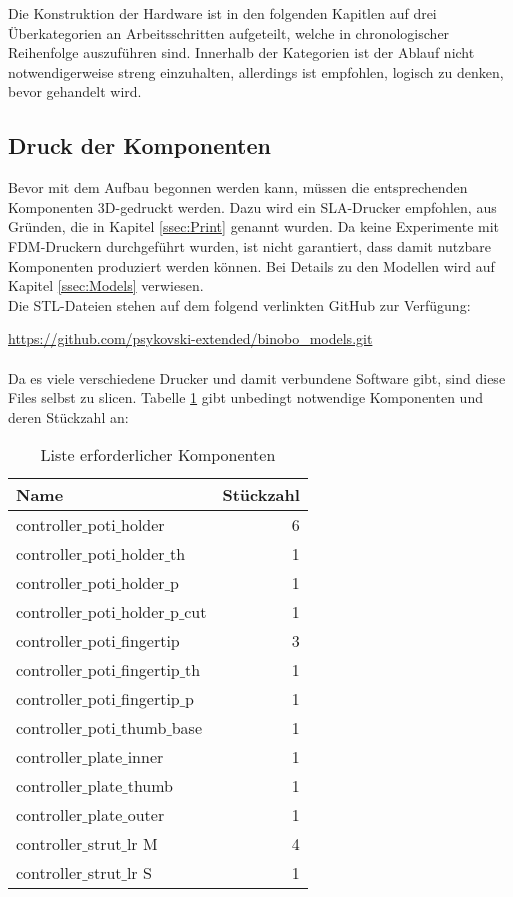 Die Konstruktion der Hardware ist in den folgenden Kapitlen auf drei Überkategorien 
an Arbeitsschritten aufgeteilt, welche in chronologischer Reihenfolge auszuführen sind. 
Innerhalb der Kategorien ist der Ablauf nicht notwendigerweise streng einzuhalten, 
allerdings ist empfohlen, logisch zu denken, bevor gehandelt wird.

\subsection{Druck der Komponenten}
\label{ssec:print}
Bevor mit dem Aufbau begonnen werden kann, müssen die entsprechenden Komponenten 3D-gedruckt 
werden. Dazu wird ein SLA-Drucker empfohlen, aus Gründen, die in Kapitel \ref{ssec:Print} genannt wurden. 
Da keine Experimente mit FDM-Druckern durchgeführt wurden, ist nicht garantiert, dass damit nutzbare 
Komponenten produziert werden können.
Bei Details zu den Modellen wird auf Kapitel \ref{ssec:Models} verwiesen.
\\
Die STL-Dateien stehen auf dem folgend verlinkten GitHub zur Verfügung:

\url{https://github.com/psykovski-extended/binobo_models.git}
\\\\
Da es viele verschiedene Drucker und damit verbundene Software gibt, sind diese Files selbst zu 
slicen. Tabelle \ref{tab:comp} gibt unbedingt notwendige Komponenten und deren Stückzahl an:

\begin{table}[H]
    \centering
    \begin{tabular}{|l|r|}
        \hline
        Name&Stückzahl\\
        \hline
        \hline
        controller$\_$poti$\_$holder&6\\
        \hline
        controller$\_$poti$\_$holder$\_$th&1\\
        \hline
        controller$\_$poti$\_$holder$\_$p&1\\
        \hline
        controller$\_$poti$\_$holder$\_$p$\_$cut&1\\
        \hline
        controller$\_$poti$\_$fingertip&3\\
        \hline
        controller$\_$poti$\_$fingertip$\_$th&1\\
        \hline
        controller$\_$poti$\_$fingertip$\_$p&1\\
        \hline
        controller$\_$poti$\_$thumb$\_$base&1\\
        \hline
        controller$\_$plate$\_$inner&1\\
        \hline
        controller$\_$plate$\_$thumb&1\\
        \hline
        controller$\_$plate$\_$outer&1\\
        \hline
        controller$\_$strut$\_$lr M&4\\
        \hline
        controller$\_$strut$\_$lr S&1\\
        \hline
    \end{tabular}
    \caption{Liste erforderlicher Komponenten}
    \label{tab:comp}
\end{table}

